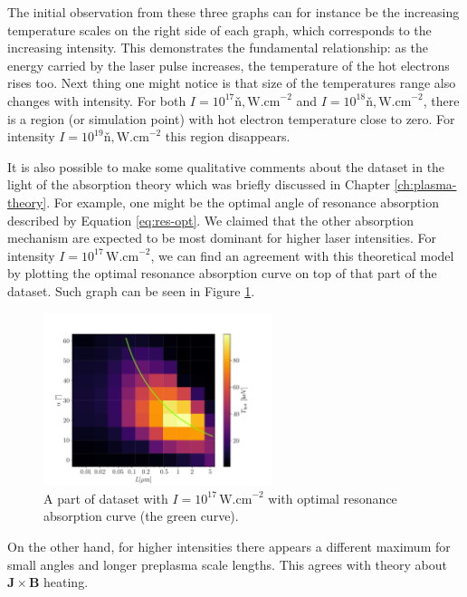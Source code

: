 The initial observation from these three graphs can for instance be the increasing temperature scales on the right side of each graph, which corresponds to the increasing intensity. This demonstrates the fundamental relationship: as the energy carried by the laser pulse increases, the temperature of the hot electrons rises too. Next thing one might notice is that size of the temperatures range also changes with intensity. For both $I = 10^{17}ň, \mathrm{W.cm}^{-2}$ and $I = 10^{18}ň, \mathrm{W.cm}^{-2}$, there is a region (or simulation point) with hot electron temperature close to zero. For intensity $I = 10^{19} ň,\mathrm{W.cm}^{-2}$ this region disappears. 

It is also possible to make some qualitative comments about the dataset in the light of the absorption theory which was briefly discussed in Chapter \ref{ch:plasma-theory}. For example, one might be the optimal angle of resonance absorption described by Equation \ref{eq:res-opt}. We claimed that the other absorption mechanism are expected to be most dominant for higher laser intensities. For intensity $I = 10^{17} \, \mathrm{W.cm}^{-2}$, we can find an agreement with this theoretical model by plotting the optimal resonance absorption curve on top of that part of the dataset. Such graph can be seen in Figure \ref{fig:opt-res-abs}.

\begin{figure}[t]
	\centering
	\includegraphics[width=0.60\textwidth]{figures/optimal-res-absorption}
	\caption{A part of dataset with $I = 10^{17} \, \mathrm{W.cm}^{-2}$ with optimal resonance absorption curve (the green curve).}
	\label{fig:opt-res-abs}
\end{figure}

On the other hand, for higher intensities there appears a different maximum for small angles and longer preplasma scale lengths. This agrees with theory about $\bm{J} \times \bm{B}$ heating.


